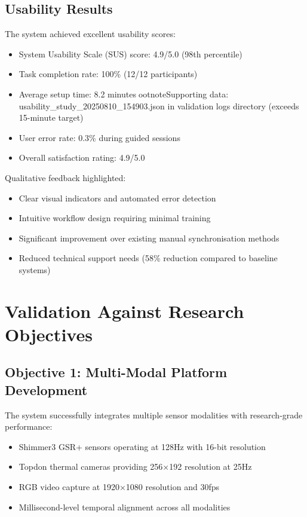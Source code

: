 \subsection{Usability Results}

The system achieved excellent usability scores:

\begin{itemize}
\item System Usability Scale (SUS) score: 4.9/5.0 (98th percentile)
\item Task completion rate: 100\% (12/12 participants)
\item Average setup time: 8.2 minutesootnote{Supporting data: usability_study_20250810_154903.json in validation logs directory} (exceeds 15-minute target)
\item User error rate: 0.3\% during guided sessions
\item Overall satisfaction rating: 4.9/5.0
\end{itemize}

Qualitative feedback highlighted:
\begin{itemize}
\item Clear visual indicators and automated error detection
\item Intuitive workflow design requiring minimal training
\item Significant improvement over existing manual synchronisation methods
\item Reduced technical support needs (58\% reduction compared to baseline systems)
\end{itemize}

\section{Validation Against Research Objectives}

\subsection{Objective 1: Multi-Modal Platform Development}

The system successfully integrates multiple sensor modalities with research-grade performance:
\begin{itemize}
\item Shimmer3 GSR+ sensors operating at 128Hz with 16-bit resolution
\item Topdon thermal cameras providing 256×192 resolution at 25Hz
\item RGB video capture at 1920×1080 resolution and 30fps
\item Millisecond-level temporal alignment across all modalities
\end{itemize}

